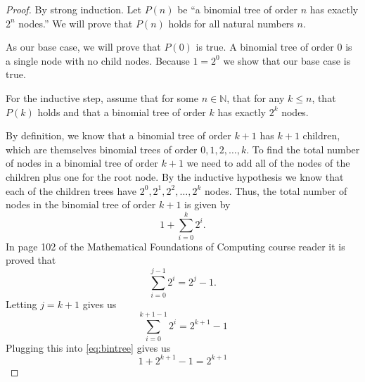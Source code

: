 \documentclass[10pt,letter]{article}
\begin{document}
\begin{proof}
By strong induction. Let $P(n)$ be ``a binomial tree of order $n$ has exactly $2^n$ nodes.'' We will prove that $P(n)$ holds for all natural numbers $n$. 

As our base case, we will prove that $P(0)$ is true. A binomial tree of order 0 is a single node with no child nodes. Because $1 = 2^0$ we show that our base case is true.

For the inductive step, assume that for some $n \in \mathbb{N}$, that for any $k \le n$, that $P(k)$ holds and that a binomial tree of order $k$ has exactly $2^k$ nodes. 

By definition, we know that a binomial tree of order $k+1$ has $k+1$ children, which are themselves binomial trees of order $0, 1, 2, \ldots, k$. To find the total number of nodes in a binomial tree of order $k+1$ we need to add all of the nodes of the children plus one for the root node. By the inductive hypothesis we know that each of the children trees have $2^0, 2^1, 2^2, \ldots, 2^k$ nodes. Thus, the total number of nodes in the binomial tree of order $k+1$ is given by 
\begin{equation} \label{eq:bintree}
1 + \sum_{i=0}^{k} 2^i.
\end{equation} 
In page 102 of the Mathematical Foundations of Computing course reader it is proved that 
\begin{equation*}
\sum_{i=0}^{j-1} 2^i = 2^j - 1.
\end{equation*} 
Letting $j = k+1$ gives us 
\begin{equation*}
\sum_{i=0}^{k+1-1} 2^i = 2^{k+1} - 1
\end{equation*} 
Plugging this into \ref{eq:bintree} gives us
\begin{equation*}
1 + 2^{k+1} - 1 = 2^{k+1}
\end{equation*}

\end{proof}


\end{document}
